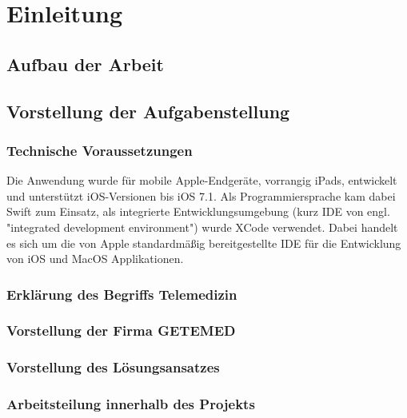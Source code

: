 \section{Einleitung}

\subsection{Aufbau der Arbeit}

\subsection{Vorstellung der Aufgabenstellung}

\subsubsection{Technische Voraussetzungen}

Die Anwendung wurde für mobile Apple-Endgeräte, vorrangig iPads, entwickelt und unterstützt iOS-Versionen bis iOS 7.1. Als Programmiersprache kam dabei Swift zum Einsatz, als integrierte Entwicklungsumgebung (kurz IDE von engl. "integrated development environment") wurde XCode verwendet. Dabei handelt es sich um die von Apple standardmäßig bereitgestellte IDE für die Entwicklung von iOS und MacOS Applikationen.

\subsubsection{Erklärung des Begriffs Telemedizin}
\subsubsection{Vorstellung der Firma GETEMED}
\subsubsection{Vorstellung des Lösungsansatzes}
\subsubsection{Arbeitsteilung innerhalb des Projekts}